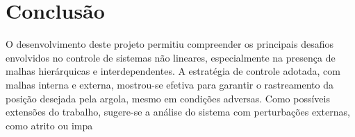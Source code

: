 \documentclass[a4paper, 12pt]{article} %
\begin{document}

\section{Conclusão}
O desenvolvimento deste projeto permitiu compreender os principais desafios envolvidos no controle de sistemas não lineares, especialmente na presença de malhas hierárquicas e interdependentes. A estratégia de controle adotada, com malhas interna e externa, mostrou-se efetiva para garantir o rastreamento da posição desejada pela argola, mesmo em condições adversas. Como possíveis extensões do trabalho, sugere-se a análise do sistema com perturbações externas, como atrito ou impa
\end{document}
